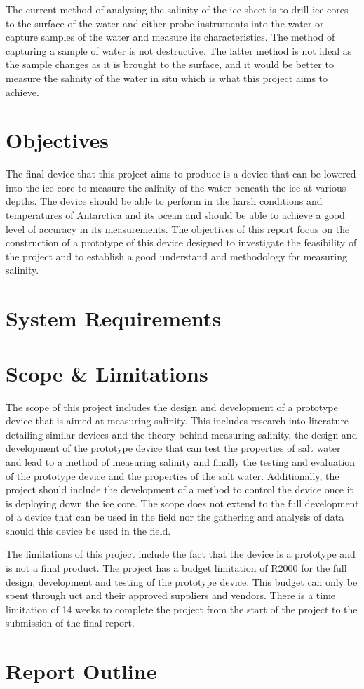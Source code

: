 The current method of analysing the salinity of the ice sheet is to drill ice cores to the surface of the water and either probe instruments into the water or capture samples of the water and measure its characteristics.
The method of capturing a sample of water is not destructive.
The latter method is not ideal as the sample changes as it is brought to the surface, and it would be better to measure the salinity of the water in situ which is what this project aims to achieve.

\section{Objectives}
The final device that this project aims to produce is a device that can be lowered into the ice core to measure the salinity of the water beneath the ice at various depths.
The device should be able to perform in the harsh conditions and temperatures of Antarctica and its ocean and should be able to achieve a good level of accuracy in its measurements.
The objectives of this report focus on the construction of a prototype of this device designed to investigate the feasibility of the project and to establish a good understand and methodology for measuring salinity.

\section{System Requirements}
\lipsum[1]

\section{Scope \& Limitations}
The scope of this project includes the design and development of a prototype device that is aimed at measuring salinity.
This includes research into literature detailing similar devices and the theory behind measuring salinity, the design and development of the prototype device that can test the properties of salt water and lead to a method of measuring salinity and finally the testing and evaluation of the prototype device and the properties of the salt water.
Additionally, the project should include the development of a method to control the device once it is deploying down the ice core.
The scope does not extend to the full development of a device that can be used in the field nor the gathering and analysis of data should this device be used in the field.

The limitations of this project include the fact that the device is a prototype and is not a final product.
The project has a budget limitation of R2000 for the full design, development and testing of the prototype device.
This budget can only be spent through \gls{uct} and their approved suppliers and vendors.
There is a time limitation of 14 weeks to complete the project from the start of the project to the submission of the final report.

\section{Report Outline}
\lipsum[1]